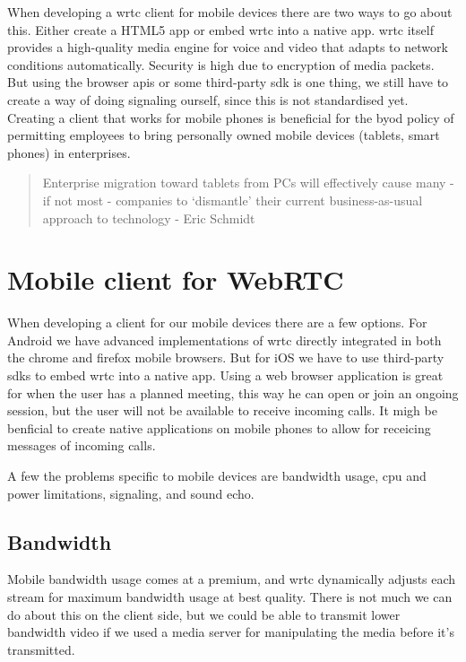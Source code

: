 When developing a \gls{wrtc} client for mobile devices there are two ways to go about this. Either create a HTML5 app or embed \gls{wrtc} into a native app. \gls{wrtc} itself provides a high-quality media engine for voice and video that adapts to network conditions automatically. Security is high due to encryption of media packets. But using the browser \gls{api}s or some third-party \gls{sdk} is one thing, we still have to create a way of doing signaling ourself, since this is not standardised yet. Creating a client that works for mobile phones is beneficial for the \gls{byod} policy of permitting employees to bring personally owned mobile devices (tablets, smart phones) in enterprises.

\begin{quote}
Enterprise migration toward tablets from PCs will effectively cause many - if not most - companies to `dismantle' their current business-as-usual approach to technology - Eric Schmidt
\end{quote}


\section{Mobile client for WebRTC}
When developing a client for our mobile devices there are a few options. For Android we have advanced implementations of \gls{wrtc} directly integrated in both the chrome and firefox mobile browsers. But for iOS we have to use third-party \gls{sdk}s to embed \gls{wrtc} into a native app.
Using a web browser application is great for when the user has a planned meeting, this way he can open or join an ongoing session, but the user will not be available to receive incoming calls. It migh be benficial to create native applications on mobile phones to allow for receicing messages of incoming calls.

A few the problems specific to mobile devices are bandwidth usage, \gls{cpu} and power limitations, signaling, and sound echo.

\subsection{Bandwidth}
Mobile bandwidth usage comes at a premium, and \gls{wrtc} dynamically adjusts each stream for maximum bandwidth usage at best quality. There is not much we can do about this on the client side, but we could be able to transmit lower bandwidth video if we used a media server for manipulating the media before it's transmitted. 


